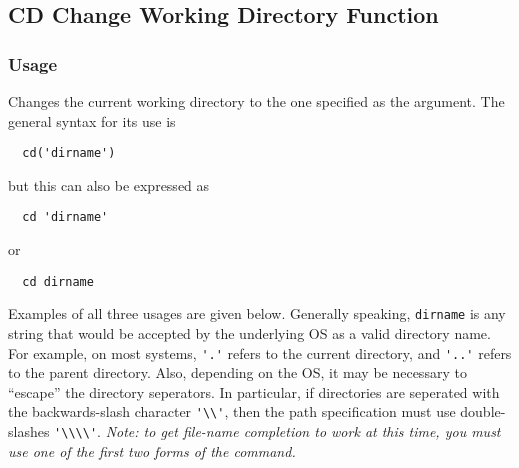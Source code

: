 %
%
%
\subsection{CD Change Working Directory Function}
\subsubsection{Usage}
Changes the current working directory to the one specified as the argument.  The general syntax for its use is
\begin{verbatim}
  cd('dirname')
\end{verbatim}
but this can also be expressed as
\begin{verbatim}
  cd 'dirname'
\end{verbatim}
or 
\begin{verbatim}
  cd dirname
\end{verbatim}
Examples of all three usages are given below.
Generally speaking, \verb|dirname| is any string that would be accepted by the underlying OS as a valid directory name.  For example, on most systems, \verb|'.'| refers to the current directory, and \verb|'..'| refers to the parent directory.  Also, depending on the OS, it may be necessary to ``escape'' the directory seperators.  In particular, if directories are seperated with the backwards-slash character \verb|'\\'|, then the path specification must use double-slashes \verb|'\\\\'|. \emph{Note: to get file-name completion to work at this time, you must use one of the first two forms of the command.}
